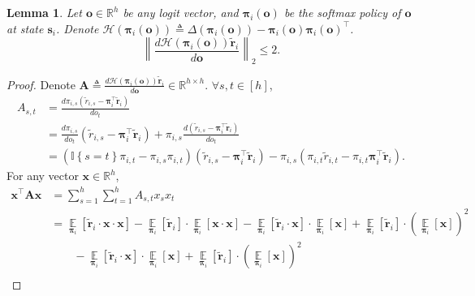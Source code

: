 \documentclass[10pt]{article}
\def\rvo{{\mathbf{o}}}
\def\rvs{{\mathbf{s}}}
\def\rvx{{\mathbf{x}}}
\def\rvo{{\mathbf{o}}}
\def\rvtilder{{\tilde{\mathbf{r}}}}
\newtheorem{lem}{Lemma}
\def\rvpi{{\boldsymbol{\pi}}}
\def\rmA{{\mathbf{A}}}
\def\sE{{\mathbb{E}}}
\def\sR{{\mathbb{R}}}
\def\sI{{\mathbb{I}}}
\def\gH{{\mathcal{H}}}
\DeclareMathOperator*{\expectation}{\sE}
\begin{document}
\begin{lem}
    Let $\rvo \in \sR^h$ be any logit vector, and $\rvpi_i(\rvo)$ be the softmax policy of $\rvo$ at state $\rvs_i$. Denote $\gH\left( \rvpi_i \left(\rvo \right) \right) \triangleq \Delta \left( \rvpi_i \left(\rvo \right) \right) - \rvpi_i \left(\rvo \right) \rvpi_i \left(\rvo \right)^\top$.
\begin{equation*}
    \left\| \frac{d \gH\left( \rvpi_i \left(\rvo \right) \right) \rvtilder_i}{d \rvo } \right\|_2 \le 2.
\end{equation*}
\end{lem}
\begin{proof}
    Denote $\rmA \triangleq \frac{d \gH\left( \rvpi_i \left(\rvo \right) \right) \rvtilder_i}{d \rvo } \in \sR^{h \times h}$. $\forall s, t \in [h]$,
\begin{equation*}
\begin{split}
    A_{s, t} &= \frac{d \pi_{i,s} \left( \tilde{r}_{i,s} - \rvpi_i^\top \rvtilder_i \right) }{d o_{t}} \\
    &= \frac{d \pi_{i,s} }{d o_{t}} \left( \tilde{r}_{i,s} - \rvpi_i^\top \rvtilder_i \right) + \pi_{i,s} \frac{d \left( \tilde{r}_{i,s} - \rvpi_i^\top \rvtilder_i \right) }{d o_{t}} \\
    &=\left ( \sI\left\{ s = t\right\} \pi_{i,t} -  \pi_{i,s } \pi_{i,t} \right) \left( \tilde{r}_{i,s} - \rvpi_i^\top \rvtilder_i \right) - \pi_{i,s} \left( \pi_{i,t} \tilde{r}_{i,t} - \pi_{i,t} \rvpi_i^\top \rvtilder_i \right).
\end{split}
\end{equation*}
For any vector $\rvx \in \sR^h$, 
\begin{equation*}
\begin{split}
    \rvx^\top \rmA \rvx &= \sum\limits_{s=1}^{h}{ \sum\limits_{t=1}^{h}{ A_{s,t} x_s x_t} } \\
    &= \expectation\limits_{\rvpi_i}\left[ \rvtilder_i \cdot \rvx \cdot \rvx \right] - \expectation\limits_{\rvpi_i}\left[ \rvtilder_i \right] \cdot \expectation\limits_{\rvpi_i}\left[ \rvx \cdot \rvx \right] - \expectation\limits_{\rvpi_i}\left[ \rvtilder_i \cdot \rvx \right] \cdot \expectation\limits_{\rvpi_i}\left[ \rvx \right] + \expectation\limits_{\rvpi_i}\left[ \rvtilder_i \right] \cdot \left( \expectation\limits_{\rvpi_i}\left[ \rvx \right] \right)^2 \\
    &\qquad - \expectation\limits_{\rvpi_i}\left[ \rvtilder_i \cdot \rvx \right] \cdot \expectation\limits_{\rvpi_i}\left[ \rvx \right] + \expectation\limits_{\rvpi_i}\left[ \rvtilder_i \right] \cdot \left( \expectation\limits_{\rvpi_i}\left[ \rvx \right] \right)^2 \\

\end{split}
\end{equation*}
\end{proof}
\end{document}

